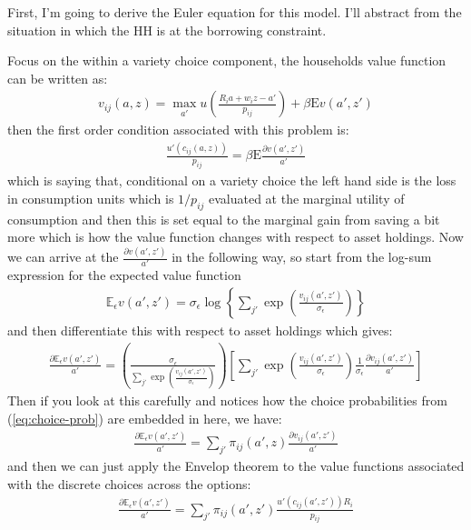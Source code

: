 \documentclass[12pt,pdftex]{article}
\begin{document}
\begin{onehalfspacing}
First, I'm going to derive the Euler equation for this model. I'll abstract from the situation in which the HH is at the borrowing constraint.

Focus on the within a variety choice component, the households value function can be written as:
\begin{align}
v_{ij}(a, z) = \max_{a'} u \left( \frac{R_i a + w_i z - a'}{p_{ij}} \right) + \beta  \mathrm{E} v(a', z')
\end{align}
then the first order condition associated with this problem is:
\begin{align}
\frac{u'(c_{ij}(a, z))}{p_{ij}} = \beta \mathrm{E} \frac{\partial v(a', z')}{a'}
\end{align}
which is saying that, conditional on a variety choice the left hand side is the loss in consumption units which is $1 / p_{ij}$ evaluated at the marginal utility of consumption and then this is set equal to the marginal gain from saving a bit more which is how the value function changes with respect to asset holdings. Now we can arrive at the $\frac{\partial v(a', z')}{a'}$ in the following way, so start from the log-sum expression for the expected value function
\begin{align}
\mathbb{E}_{\epsilon} v(a', z') =  \sigma_{\epsilon} \log \left\{ \sum_{j'} \exp \left( \frac{  v_{ij}(a', z')}{\sigma_{\epsilon}} \right) \right\}
\end{align}
and then differentiate this with respect to asset holdings which gives:
\begin{align}
\frac{\partial \mathbb{E}_{\epsilon} v(a', z')}{a'} = \left( \frac{\sigma_{\epsilon}}{\sum_{j'} \exp \left( \frac{  v_{ij}(a', z')}{\sigma_{\epsilon}}\right)} \right)
\left[ \sum_{j'} \exp \left( \frac{  v_{ij}(a', z')}{\sigma_{\epsilon}}\right) \frac{1}{\sigma_{\epsilon}} \frac{\partial v_{ij}(a', z')}{a'}  \right]
\end{align}
Then if you look at this carefully and notices how the choice probabilities from (\ref{eq:choice-prob}) are embedded in here, we have:
\begin{align}
\frac{\partial \mathbb{E}_{\epsilon} v(a', z')}{a'} = \sum_{j'} \pi_{ij}(a', z) \frac{\partial v_{ij}(a', z')}{a'}
\end{align}
and then we can just apply the Envelop theorem to the value functions associated with the discrete choices across the options:
\begin{align}
\frac{\partial \mathbb{E}_{\epsilon} v(a', z')}{a'} = \sum_{j'} \pi_{ij}(a', z') \frac{u'(c_{ij}(a', z'))R_{i}}{p_{ij}}

\end{align}
\end{onehalfspacing}
\end{document}
